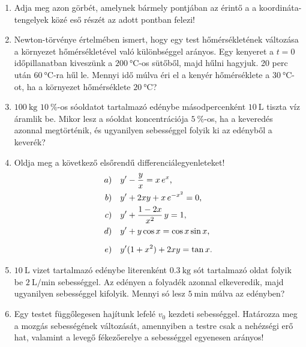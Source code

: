 \documentclass{szb-practice}
\begin{document}
\begin{enumerate}
  \item Adja meg azon görbét, amelynek bármely pontjában az érintő a
        a koordináta-ten\-ge\-lyek közé eső részét az adott pontban felezi!

  \item Newton-törvénye értelmében ismert, hogy egy test hőmérsékletének
        változása a környezet hőmérsékletével való különbséggel arányos.
        Egy kenyeret a $t = 0$ időpillanatban kiveszünk a
        $\SI{200}{\degreeCelsius}$-os sütőből, majd hűlni hagyjuk. 20 perc
        után $\SI{60}{\degreeCelsius}$-ra hűl le. Mennyi idő múlva éri el a
        kenyér hőmérséklete a $\SI{30}{\degreeCelsius}$-ot, ha a környezet
        hőmérséklete $\SI{20}{\degreeCelsius}$?

  \item $\SI{100}{\kilogram}$ $\SI{10}{\percent}$-os sóoldatot tartalmazó
        edénybe másodpercenként $\SI{10}{\liter}$ tiszta víz áramlik be.
        Mikor lesz a sóoldat koncentrációja $\SI{5}{\percent}$-os, ha a
        keveredés azonnal megtörténik, és ugyanilyen sebességgel folyik ki az
        edényből a keverék?

  \item Oldja meg a következő elsőrendű differenciálegyenleteket!
        \begin{align*}
          a) \quad y' & - \frac{y}{x} = x \, e^x
          \text,                                      \\
          b) \quad y' & + 2xy + x \, e^{-x^2} = 0
          \text,                                      \\
          c) \quad y' & + \frac{1 - 2x}{x^2} \, y = 1
          \text,                                      \\
          d) \quad y' & + y \cos x = \cos x \sin x
          \text,                                      \\[2mm]
          e) \quad y' & (1 + x^2) + 2xy = \tan x
          \text.
        \end{align*}

  \item $\SI{10}{\liter}$ vizet tartalmazó edénybe literenként
        $\SI{0,3}{\kilogram}$ sót tartalmazó oldat folyik be
        $\SI[per-mode = symbol]{2}{\liter\per\minute}$ sebességgel. Az edényen
        a folyadék azonnal elkeveredik, majd ugyanilyen sebességgel kifolyik.
        Mennyi só lesz $\SI{5}{\minute}$ múlva az edényben?

  \item Egy testet függőlegesen hajítunk lefelé $v_0$ kezdeti sebességgel.
        Határozza meg a mozgás sebességének változását, amennyiben a testre csak
        a nehézségi erő hat, valamint a levegő fékezőerelye a sebességgel
        egyenesen arányos!


\end{enumerate}
\end{document}
